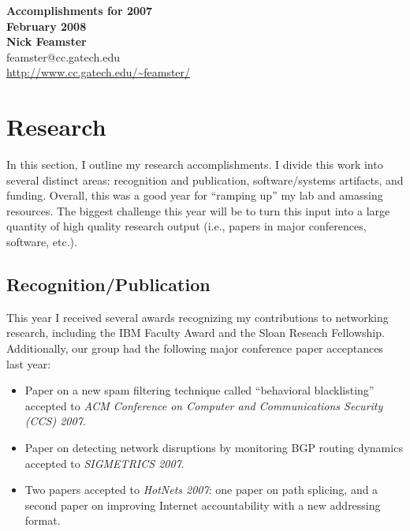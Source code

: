 \newpage 

\setcounter{page}{1}

\setcounter{page}{1}
\begin{center}
{\Large\textbf{Accomplishments for 2007 \\ February 2008}}\\[.1in]
{\large\textbf{Nick Feamster}}\\[.05in]
feamster@cc.gatech.edu \\
\url{http://www.cc.gatech.edu/~feamster/} \\[.1in]
\end{center}

\begin{sloppypar}

\section*{Research}

In this section, I outline my research accomplishments.  I divide this
work into several distinct areas: recognition and publication,
software/systems artifacts, and funding.  Overall, this was a good year
for ``ramping up'' my lab and amassing resources.  The biggest challenge
this year will be to turn this input into a large quantity of high
quality research output (i.e., papers in major conferences, software, etc.).

\subsection*{Recognition/Publication}

This year I received several awards recognizing my contributions to
networking research, including the IBM Faculty Award and the Sloan
Reseach Fellowship.  Additionally, our group had the following major
conference paper acceptances last year:

\begin{itemize}
\itemsep=-1pt
\item Paper on a new spam filtering technique called ``behavioral
  blacklisting'' accepted to {\em ACM Conference on Computer and
  Communications Security (CCS) 2007}.
\item Paper on detecting network disruptions by monitoring BGP routing
  dynamics accepted to {\em SIGMETRICS 2007}. 
\item Two papers accepted to {\em HotNets 2007}: one paper on path
  splicing, and a second paper on improving Internet accountability with
  a new addressing format.
\end{itemize}


\end{sloppypar}
